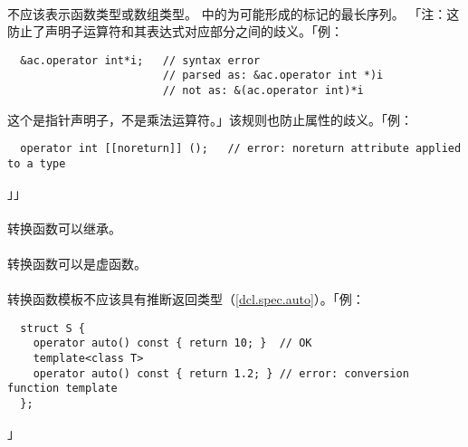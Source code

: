 \paragraph{}
不应该表示函数类型或数组类型。
中的为可能形成的标记的最长序列。
「注：这防止了声明子运算符\tm{*}和其表达式对应部分之间的歧义。「例：
\begin{lstlisting}
  &ac.operator int*i;   // syntax error
                        // parsed as: &ac.operator int *)i
                        // not as: &(ac.operator int)*i
\end{lstlisting}
这个\tm{*}是指针声明子，不是乘法运算符。」该规则也防止属性的歧义。「例：
\begin{lstlisting}
  operator int [[noreturn]] ();   // error: noreturn attribute applied to a type
\end{lstlisting}」」

\paragraph{}
转换函数可以继承。

\paragraph{}
转换函数可以是虚函数。

\paragraph{}
转换函数模板不应该具有推断返回类型（\ref{dcl.spec.auto}）。「例：
\begin{lstlisting}
  struct S {
    operator auto() const { return 10; }  // OK
    template<class T>
    operator auto() const { return 1.2; } // error: conversion function template
  };
\end{lstlisting}」

